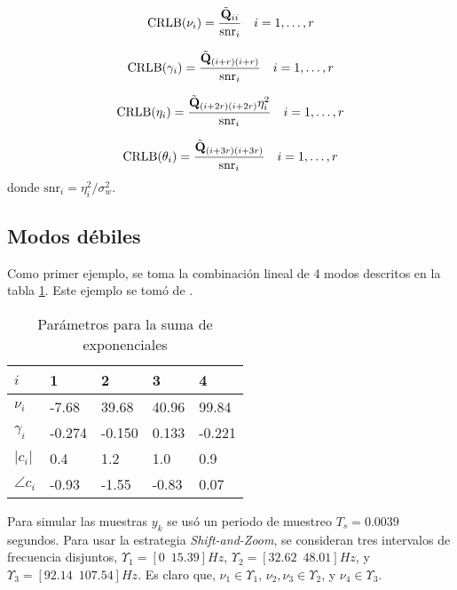 			\begin{equation}
				\mathrm{CRLB}(\nu_i) = \frac{\tilde{\mathbf{Q}}_{ii}}{\mathrm{snr}_i}\quad i=1,\ldots,r
				\label{Eq:CRLB_nu}
			\end{equation}
			
			\begin{equation}
				\mathrm{CRLB}(\gamma_i) = \frac{\tilde{\mathbf{Q}}_{(i+r)(i+r)}}{\mathrm{snr}_i}\quad i=1,\ldots,r
				\label{Eq:CRLB_gamma}
			\end{equation}
			
			\begin{equation}
				\mathrm{CRLB}(\eta_i) = \frac{\tilde{\mathbf{Q}}_{(i+2r)(i+2r)}\eta_i^2}{\mathrm{snr}_i}\quad i=1,\ldots,r
				\label{Eq:CRLB_eta}
			\end{equation}
			
			\begin{equation}
				\mathrm{CRLB}(\theta_i) = \frac{\tilde{\mathbf{Q}}_{(i+3r)(i+3r)}}{\mathrm{snr}_i}\quad i=1,\ldots,r
				\label{Eq:CRLB_theta}
			\end{equation}
			donde $\mathrm{snr}_i = \eta_i^2/\sigma_w^2$.
			
		
		\subsection{Modos débiles}
			
			Como primer ejemplo, se toma la combinación lineal de 4 modos descritos en la tabla \ref{Table:Anderson}. Este ejemplo se tomó de \cite{Andersson2014}. 
			
			\begin{table}[h!]
				\centering
				\begin{tabular}{lllll}
					$i$          & 1      & 2      & 3     & 4      \\ \hline 
					$\nu_i$      & -7.68  & 39.68  & 40.96 & 99.84  \\ 
					$\gamma_i$   & -0.274 & -0.150 & 0.133 & -0.221 \\ 
					$|c_i|$      & 0.4    & 1.2    & 1.0   & 0.9    \\ 
					$\angle c_i$ & -0.93  & -1.55  & -0.83 & 0.07   \\ 
					\hline
				\end{tabular}
				\caption{Parámetros para la suma de exponenciales \cite{Andersson2014}}
			\label{Table:Anderson}
			\end{table}
			
			Para simular las muestras $y_k$ se usó un periodo de muestreo $T_s = 0.0039$ segundos. Para usar la estrategia \emph{Shift-and-Zoom}, se consideran tres intervalos de frecuencia disjuntos, $\Upsilon_1 = [0\,\,\, 15.39]Hz$, $\Upsilon_2 = [32.62\,\,\, 48.01]Hz$, y $\Upsilon_3 = [92.14\,\,\, 107.54]Hz$. Es claro que, $\nu_1\in \Upsilon_1$, $\nu_2, \nu_3 \in \Upsilon_2$, y $\nu_4\in \Upsilon_3$.
			
